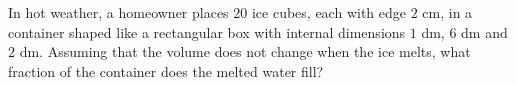 In hot weather, a homeowner places $20$ ice cubes, each with edge $2$ cm, in a container shaped like a rectangular box with internal dimensions $1$ dm, $6$ dm and $2$ dm. Assuming that the volume does not change when the ice melts, what fraction of the container does the melted water fill?
